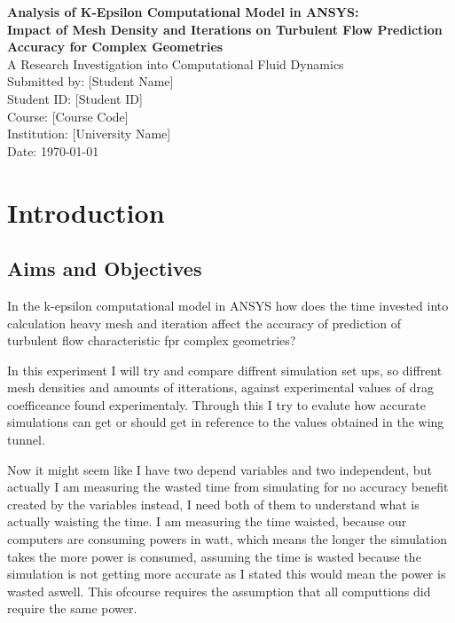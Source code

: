 \documentclass[12pt,a4paper]{article}
\begin{document}
\begin{titlepage}
\centering
\vspace*{2cm}
{\LARGE\bfseries Analysis of K-Epsilon Computational Model in ANSYS:\\[0.5cm] 
Impact of Mesh Density and Iterations on Turbulent Flow Prediction Accuracy for Complex Geometries}\\[2cm]

{\large A Research Investigation into Computational Fluid Dynamics}\\[1.5cm]

{\large Submitted by: [Student Name]}\\[0.5cm]
{\large Student ID: [Student ID]}\\[0.5cm]
{\large Course: [Course Code]}\\[0.5cm]
{\large Institution: [University Name]}\\[1.5cm]

{\large Date: \today}\\[2cm]

\vfill
\end{titlepage}

\newpage
\tableofcontents
\newpage

\listoffigures
\newpage

\listoftables
\newpage

\section{Introduction}

\subsection{Aims and Objectives}

In the k-epsilon computational model in ANSYS how does the time invested into calculation heavy mesh and iteration affect the accuracy of prediction of turbulent flow characteristic fpr complex geometries?

In this experiment I will try and compare diffrent simulation set ups, so diffrent mesh densities and amounts of itterations, against experimental values of drag coefficeance found experimentaly. Through this I try to evalute how accurate simulations can get or should get in reference to the values obtained in the wing tunnel.

Now it might seem like I have two depend variables and two independent, but actually I am measuring the wasted time from simulating for no accuracy benefit created by the variables instead, I need both of them to understand what is actually waisting the time. I am measuring the time waisted, because our computers are consuming powers in watt, which means the longer the simulation takes the more power is consumed, assuming the time is wasted because the simulation is not getting more accurate as I stated this would mean the power is wasted aswell. This ofcourse requires the assumption that all computtions did require the same power.
\end{document}
